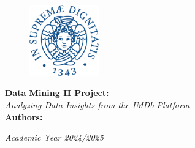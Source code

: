 \documentclass[a4paper,10pt]{article}
\begin{document}
\begin{titlepage}
\setcounter{page}{0} %
\begin{figure}[htp]
\centering
\includegraphics[width=3cm]{cherubino_pant541.pdf} %
\end{figure}

\vspace{2cm} %

\begin{center}
\textbf{\fontsize{18pt}{10pt}\selectfont Data Mining II Project:}\\
\vspace{0.5cm}
\textit{\fontsize{16pt}{10pt}\selectfont Analyzing Data Insights from the IMDb Platform}\\

\vspace{1cm} %
\textbf{Authors:}\\
\vspace{0.3cm}



\vspace{10cm} %
\textit{Academic Year 2024/2025}
\end{center}

\end{titlepage}


\tableofcontents

\clearpage















\end{document}
